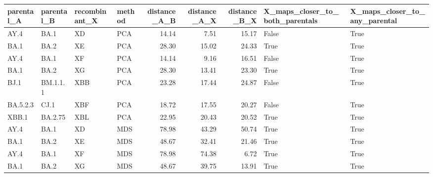 \begin{tabular}{llllrrrll}
\toprule
parental\_A & parental\_B & recombinant\_X & method &  distance\_A\_B &  distance\_A\_X &  distance\_B\_X &  X\_maps\_closer\_to\_both\_parentals &  X\_maps\_closer\_to\_any\_parental \\
\midrule
      AY.4 &       BA.1 &            XD &    PCA &         14.14 &          7.51 &         15.17 &                            False &                           True \\
      BA.1 &       BA.2 &            XE &    PCA &         28.30 &         15.02 &         24.33 &                             True &                           True \\
      AY.4 &       BA.1 &            XF &    PCA &         14.14 &          9.16 &         16.51 &                            False &                           True \\
      BA.1 &       BA.2 &            XG &    PCA &         28.30 &         13.41 &         23.30 &                             True &                           True \\
      BJ.1 &   BM.1.1.1 &           XBB &    PCA &         23.28 &         17.44 &         24.87 &                            False &                           True \\
  BA.5.2.3 &       CJ.1 &           XBF &    PCA &         18.72 &         17.55 &         20.27 &                            False &                           True \\
     XBB.1 &    BA.2.75 &           XBL &    PCA &         22.95 &         20.43 &         20.52 &                             True &                           True \\
      AY.4 &       BA.1 &            XD &    MDS &         78.98 &         43.29 &         50.74 &                             True &                           True \\
      BA.1 &       BA.2 &            XE &    MDS &         48.67 &         32.41 &         21.46 &                             True &                           True \\
      AY.4 &       BA.1 &            XF &    MDS &         78.98 &         74.38 &          6.72 &                             True &                           True \\
      BA.1 &       BA.2 &            XG &    MDS &         48.67 &         39.75 &         13.91 &                             True &                           True \\

\end{tabular}

